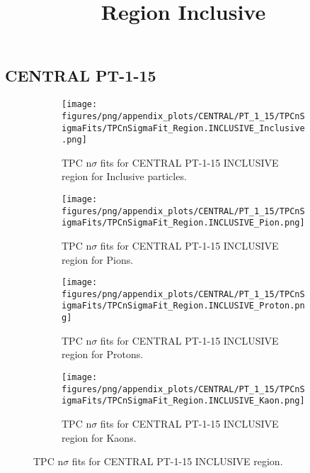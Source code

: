 

    
            \subsection{CENTRAL PT-1-15}
            \begin{figure}[H]
                \title{Region Inclusive}
                \begin{subfigure}[b]{0.5\textwidth}
                    \centering
                    \texttt{[image: figures/png/appendix\_plots/CENTRAL/PT\_1\_15/TPCnSigmaFits/TPCnSigmaFit\_Region.INCLUSIVE\_Inclusive.png]}
                    \caption{TPC n$\sigma$ fits for CENTRAL PT-1-15 INCLUSIVE region for Inclusive particles.}
                    \label{fig:appendix_CENTRAL_PT-1-15_INCLUSIVE_Inclusive}
                \end{subfigure}
                \begin{subfigure}[b]{0.5\textwidth}
                    \centering
                    \texttt{[image: figures/png/appendix\_plots/CENTRAL/PT\_1\_15/TPCnSigmaFits/TPCnSigmaFit\_Region.INCLUSIVE\_Pion.png]}
                    \caption{TPC n$\sigma$ fits for CENTRAL PT-1-15 INCLUSIVE region for Pions.}
                    \label{fig:appendix_CENTRAL_PT-1-15_INCLUSIVE_Pion}
                \end{subfigure}
                \begin{subfigure}[b]{0.5\textwidth}
                    \centering
                    \texttt{[image: figures/png/appendix\_plots/CENTRAL/PT\_1\_15/TPCnSigmaFits/TPCnSigmaFit\_Region.INCLUSIVE\_Proton.png]}
                    \caption{TPC n$\sigma$ fits for CENTRAL PT-1-15 INCLUSIVE region for Protons.}
                    \label{fig:appendix_CENTRAL_PT-1-15_INCLUSIVE_Proton}
                \end{subfigure}
                \begin{subfigure}[b]{0.5\textwidth}
                    \centering
                    \texttt{[image: figures/png/appendix\_plots/CENTRAL/PT\_1\_15/TPCnSigmaFits/TPCnSigmaFit\_Region.INCLUSIVE\_Kaon.png]}
                    \caption{TPC n$\sigma$ fits for CENTRAL PT-1-15 INCLUSIVE region for Kaons.}
                    \label{fig:appendix_CENTRAL_PT-1-15_INCLUSIVE_Kaon}
                \end{subfigure}
                \caption{TPC n$\sigma$ fits for CENTRAL PT-1-15 INCLUSIVE region.}
                \label{fig:appendix_CENTRAL_PT-1-15_INCLUSIVE}
            \end{figure}
